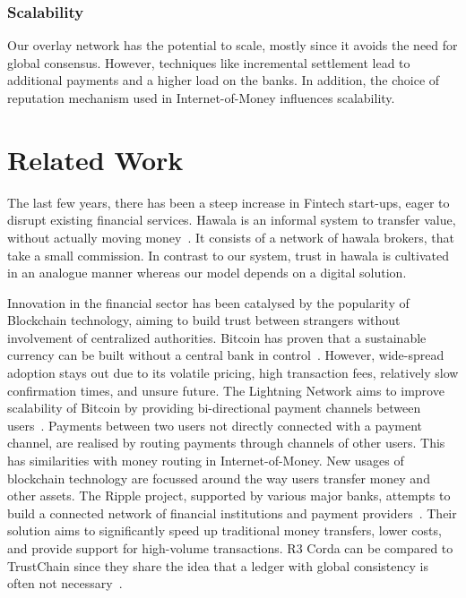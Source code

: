 \subsubsection*{Scalability}
Our overlay network has the potential to scale, mostly since it avoids the need for global consensus.
However, techniques like incremental settlement lead to additional payments and a higher load on the banks.
In addition, the choice of reputation mechanism used in Internet-of-Money influences scalability.

\section{Related Work}
The last few years, there has been a steep increase in Fintech start-ups, eager to disrupt existing financial services.
Hawala is an informal system to transfer value, without actually moving money~\cite{jost2003hawala}.
It consists of a network of hawala brokers, that take a small commission.
In contrast to our system, trust in hawala is cultivated in an analogue manner whereas our model depends on a digital solution.

Innovation in the financial sector has been catalysed by the popularity of Blockchain technology, aiming to build trust between strangers without involvement of centralized authorities.
Bitcoin has proven that a sustainable currency can be built without a central bank in control~\cite{nakamoto2008bitcoin}.
However, wide-spread adoption stays out due to its volatile pricing, high transaction fees, relatively slow confirmation times, and unsure future.
The Lightning Network aims to improve scalability of Bitcoin by providing bi-directional payment channels between users~\cite{poon2016bitcoin}.
Payments between two users not directly connected with a payment channel, are realised by routing payments through channels of other users.
This has similarities with money routing in Internet-of-Money.
New usages of blockchain technology are focussed around the way users transfer money and other assets.
The Ripple project, supported by various major banks, attempts to build a connected network of financial institutions and payment providers~\cite{schwartz2014ripple}.
Their solution aims to significantly speed up traditional money transfers, lower costs, and provide support for high-volume transactions.
R3 Corda can be compared to TrustChain since they share the idea that a ledger with global consistency is often not necessary~\cite{r3corda}.

